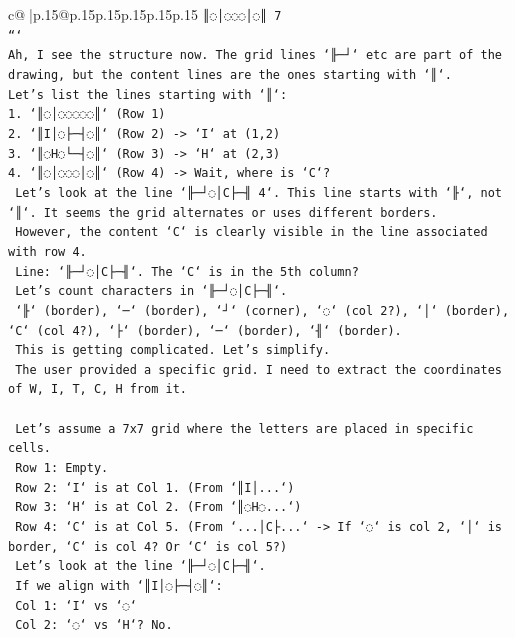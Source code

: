 \documentclass{article}
\begin{document}
{\begin{supertabular}{c@{$\;$}|p{.15\linewidth}@{}p{.15\linewidth}p{.15\linewidth}p{.15\linewidth}p{.15\linewidth}p{.15\linewidth}}
{{{\texttt{║◌│◌◌◌│◌║ 7} \\
\texttt{```} \\
\texttt{Ah, I see the structure now. The grid lines `╟─┘` etc are part of the drawing, but the content lines are the ones starting with `║`.} \\
\texttt{Let's list the lines starting with `║`:} \\
\texttt{1. `║◌│◌◌◌◌◌║` (Row 1)} \\
\texttt{2. `║I│◌├─┤◌║` (Row 2) {-}> `I` at (1,2)} \\
\texttt{3. `║◌H◌└─┤◌║` (Row 3) {-}> `H` at (2,3)} \\
\texttt{4. `║◌│◌◌◌│◌║` (Row 4) {-}> Wait, where is `C`?} \\
\texttt{   Let's look at the line `╟─┘◌│C├─╢ 4`. This line starts with `╟`, not `║`. It seems the grid alternates or uses different borders.} \\
\texttt{   However, the content `C` is clearly visible in the line associated with row 4.} \\
\texttt{   Line: `╟─┘◌│C├─╢`. The `C` is in the 5th column?} \\
\texttt{   Let's count characters in `╟─┘◌│C├─╢`.} \\
\texttt{   `╟` (border), `─` (border), `┘` (corner), `◌` (col 2?), `│` (border), `C` (col 4?), `├` (border), `─` (border), `╢` (border).} \\
\texttt{   This is getting complicated. Let's simplify.} \\
\texttt{   The user provided a specific grid. I need to extract the coordinates of W, I, T, C, H from it.} \\
\\ 
\texttt{   Let's assume a 7x7 grid where the letters are placed in specific cells.} \\
\texttt{   Row 1: Empty.} \\
\texttt{   Row 2: `I` is at Col 1. (From `║I│...`)} \\
\texttt{   Row 3: `H` is at Col 2. (From `║◌H◌...`)} \\
\texttt{   Row 4: `C` is at Col 5. (From `...│C├...` {-}> If `◌` is col 2, `│` is border, `C` is col 4? Or `C` is col 5?)} \\
\texttt{   Let's look at the line `╟─┘◌│C├─╢`.} \\
\texttt{   If we align with `║I│◌├─┤◌║`:} \\
\texttt{   Col 1: `I` vs `◌`} \\
\texttt{   Col 2: `◌` vs `H`? No.} \\
}}}
\end{supertabular}}
\end{document}
